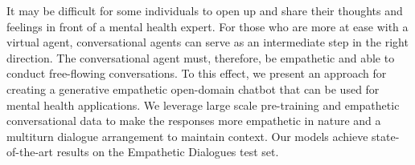It may be difficult for some individuals to open up and share their thoughts and feelings in front of a mental health expert. For those who are more at ease with a virtual agent, conversational agents can serve as an intermediate step in the right direction. The conversational agent must, therefore, be empathetic and able to conduct free-flowing conversations. To this effect, we present an approach for creating a generative empathetic open-domain chatbot that can be used for mental health applications. We leverage large scale pre-training and empathetic conversational data to make the responses more empathetic in nature and a multiturn dialogue arrangement to maintain context. Our models achieve state-of-the-art results on the Empathetic Dialogues test set.
